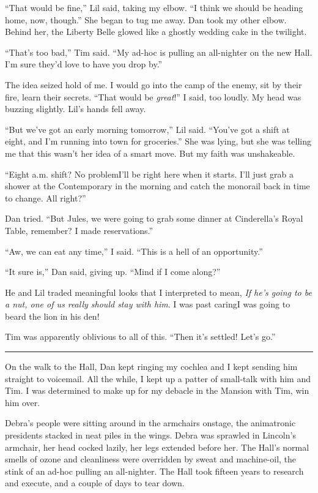 “That would be fine,” Lil said, taking my elbow. “I think we should
be heading home, now, though.” She began to tug me away. Dan took
my other elbow. Behind her, the Liberty Belle glowed like a ghostly
wedding cake in the twilight.

“That's too bad,” Tim said. “My ad-hoc is pulling an all-nighter on
the new Hall. I'm sure they'd love to have you drop by.”

The idea seized hold of me. I would go into the camp of the enemy,
sit by their fire, learn their secrets. “That would be
\emph{great}!” I said, too loudly. My head was buzzing slightly.
Lil's hands fell away.

“But we've got an early morning tomorrow,” Lil said. “You've got a
shift at eight, and I'm running into town for groceries.” She was
lying, but she was telling me that this wasn't her idea of a smart
move. But my faith was unshakeable.

“Eight a.m. shift? No problem{\dash}I'll be right here when it starts.
I'll just grab a shower at the Contemporary in the morning and
catch the monorail back in time to change. All right?”

Dan tried. “But Jules, we were going to grab some dinner at
Cinderella's Royal Table, remember? I made reservations.”

“Aw, we can eat any time,” I said. “This is a hell of an
opportunity.”

“It sure is,” Dan said, giving up. “Mind if I come along?”

He and Lil traded meaningful looks that I interpreted to mean,
\emph{If he's going to be a nut, one of us really should stay with him}.
I was past caring{\dash}I was going to beard the lion in his den!

Tim was apparently oblivious to all of this. “Then it's settled!
Let's go.”

\begin{center}\rule{1in}{0.4pt}\end{center}

On the walk to the Hall, Dan kept ringing my cochlea and I kept
sending him straight to voicemail. All the while, I kept up a
patter of small-talk with him and Tim. I was determined to make up
for my debacle in the Mansion with Tim, win him over.

Debra's people were sitting around in the armchairs onstage, the
animatronic presidents stacked in neat piles in the wings. Debra
was sprawled in Lincoln's armchair, her head cocked lazily, her
legs extended before her. The Hall's normal smells of ozone and
cleanliness were overridden by sweat and machine-oil, the stink of
an ad-hoc pulling an all-nighter. The Hall took fifteen years to
research and execute, and a couple of days to tear down.

